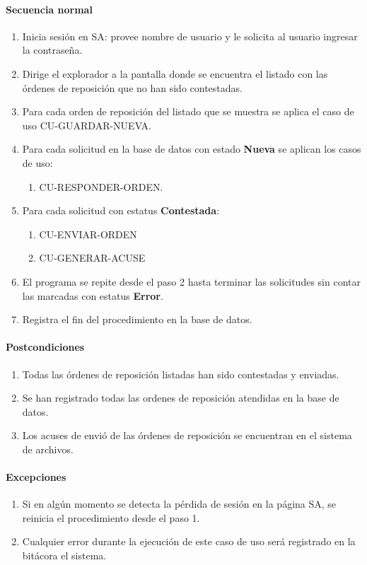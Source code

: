 \paragraph*{Secuencia normal}
\begin{enumerate}
  \item Inicia sesión en SA: provee nombre de usuario y le solicita al usuario ingresar la contraseña.
  \item Dirige el explorador a la pantalla donde se encuentra el listado con las órdenes de reposición que no han sido contestadas.
  \item Para cada orden de reposición del listado que se muestra se aplica el caso de uso CU-GUARDAR-NUEVA.
  \item Para cada solicitud en la base de datos con estado \textbf{Nueva} se aplican los casos de uso:
  \begin{enumerate}
    \item CU-RESPONDER-ORDEN.
  \end{enumerate}
  \item Para cada solicitud con estatus \textbf{Contestada}:
  \begin{enumerate}
    \item CU-ENVIAR-ORDEN
    \item CU-GENERAR-ACUSE
  \end{enumerate}
  \item El programa se repite desde el paso 2 hasta terminar las solicitudes sin contar las marcadas con estatus \textbf{Error}.
  \item Registra el fin del procedimiento en la base de datos.
\end{enumerate}
\paragraph*{Postcondiciones}
\begin{enumerate}
  \item Todas las órdenes de reposición listadas han sido contestadas y enviadas.
  \item Se han registrado todas las ordenes de reposición atendidas en la base de datos.
  \item Los acuses de envió de las órdenes de reposición se encuentran en el sistema de archivos.
\end{enumerate}
\paragraph*{Excepciones}
\begin{enumerate}
  \item Si en algún momento se detecta la pérdida de sesión en la página SA, se reinicia el procedimiento desde el paso 1.
  \item Cualquier error durante la ejecución de este caso de uso será registrado en la bitácora el sistema.
\end{enumerate}


